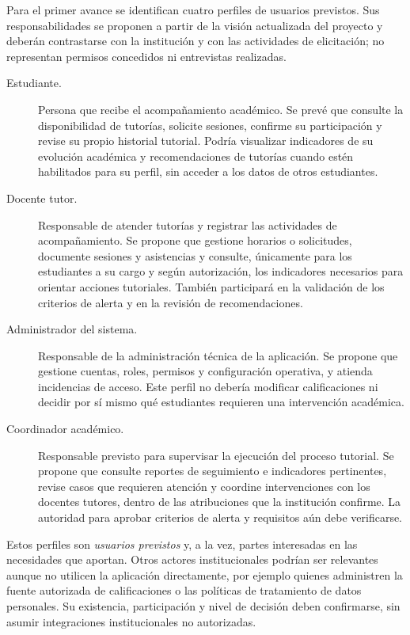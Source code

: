 
Para el primer avance se identifican cuatro perfiles de usuarios previstos. Sus responsabilidades se proponen a partir de la visión actualizada del proyecto y deberán contrastarse con la institución y con las actividades de elicitación; no representan permisos concedidos ni entrevistas realizadas.

\begin{description}
  \item[Estudiante.] Persona que recibe el acompañamiento académico. Se prevé que consulte la disponibilidad de tutorías, solicite sesiones, confirme su participación y revise su propio historial tutorial. Podría visualizar indicadores de su evolución académica y recomendaciones de tutorías cuando estén habilitados para su perfil, sin acceder a los datos de otros estudiantes.

  \item[Docente tutor.] Responsable de atender tutorías y registrar las actividades de acompañamiento. Se propone que gestione horarios o solicitudes, documente sesiones y asistencias y consulte, únicamente para los estudiantes a su cargo y según autorización, los indicadores necesarios para orientar acciones tutoriales. También participará en la validación de los criterios de alerta y en la revisión de recomendaciones.

  \item[Administrador del sistema.] Responsable de la administración técnica de la aplicación. Se propone que gestione cuentas, roles, permisos y configuración operativa, y atienda incidencias de acceso. Este perfil no debería modificar calificaciones ni decidir por sí mismo qué estudiantes requieren una intervención académica.

  \item[Coordinador académico.] Responsable previsto para supervisar la ejecución del proceso tutorial. Se propone que consulte reportes de seguimiento e indicadores pertinentes, revise casos que requieren atención y coordine intervenciones con los docentes tutores, dentro de las atribuciones que la institución confirme. La autoridad para aprobar criterios de alerta y requisitos aún debe verificarse.
\end{description}

Estos perfiles son \emph{usuarios previstos} y, a la vez, partes interesadas en las necesidades que aportan. Otros actores institucionales podrían ser relevantes aunque no utilicen la aplicación directamente, por ejemplo quienes administren la fuente autorizada de calificaciones o las políticas de tratamiento de datos personales. Su existencia, participación y nivel de decisión deben confirmarse, sin asumir integraciones institucionales no autorizadas.

